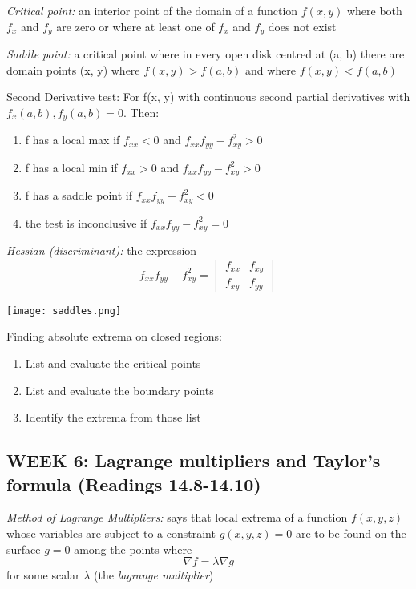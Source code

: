 \documentclass[12pt]{article}
\begin{document}
\emph{Critical point:} an interior point of the domain of a function $f(x, y)$ where both $f_x$ and $f_y$ are zero or where at least one of $f_x$ and $f_y$ does not exist

\emph{Saddle point:} a critical point where in every open disk centred at (a, b) there are domain points (x, y) where $f(x,y) > f(a,b)$ and where $f(x,y) < f(a,b)$

Second Derivative test:
For f(x, y) with continuous second partial derivatives with $f_x(a, b), f_y(a, b) = 0$. Then:
\begin{enumerate}
    \item f has a local max if $f_{xx} < 0$ and $f_{xx} f_{yy} - f_{xy}^2 > 0$
    \item f has a local min if $f_{xx} > 0$ and $f_{xx} f_{yy} - f_{xy}^2 > 0$
    \item f has a saddle point if $f_{xx} f_{yy} - f_{xy}^2 < 0$
    \item the test is inconclusive if $f_{xx} f_{yy} - f_{xy}^2 = 0$
\end{enumerate}

\emph{Hessian (discriminant):} the expression
\[ f_{xx} f_{yy} - f_{xy}^2 = \begin{vmatrix}
    f_{xx} & f_{xy}\\
    f_{xy} & f_{yy} 
\end{vmatrix}\]

\begin{center}
    \texttt{[image: saddles.png]}
\end{center}

Finding absolute extrema on closed regions:
\begin{enumerate}
    \item List and evaluate the critical points
    \item List and evaluate the boundary points
    \item Identify the extrema from those list
\end{enumerate}
\subsection{WEEK 6: Lagrange multipliers and Taylor's formula (Readings 14.8-14.10)}
\emph{Method of Lagrange Multipliers:} says that local extrema of a function $f(x,y,z)$ whose variables are subject to a constraint $g(x,y,z) = 0$ are to be found on the surface $g=0$ among the points where 
\[ \nabla f = \lambda \nabla g \]
for some scalar $\lambda$ (the \emph{lagrange multiplier})
\end{document}
